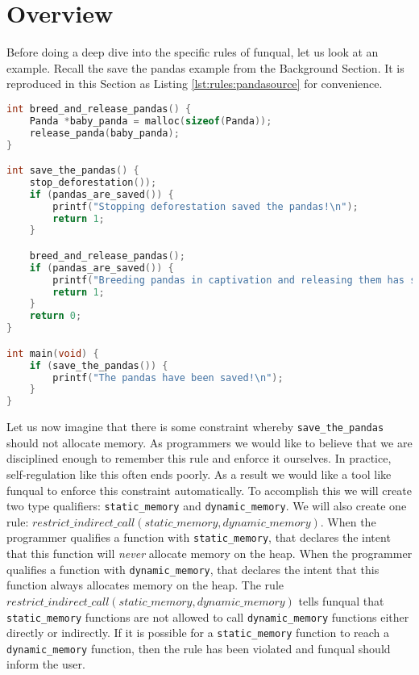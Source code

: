 \section{Overview}\label{sec:rules:overview}

Before doing a deep dive into the specific rules of funqual, let us look at an example.  Recall the save the pandas example from the Background Section.  It is reproduced in this Section as Listing \ref{lst:rules:pandasource} for convenience.  

\noindent\begin{minipage}[t]{\linewidth}
\begin{lstlisting}[language=C,caption={Example C program.  Running this code in a production environment may not actually save the pandas},label={lst:rules:pandasource}]
int breed_and_release_pandas() {
    Panda *baby_panda = malloc(sizeof(Panda));
    release_panda(baby_panda);
}

int save_the_pandas() {
	stop_deforestation());
	if (pandas_are_saved()) {
		printf("Stopping deforestation saved the pandas!\n");
		return 1;
	}

	breed_and_release_pandas();
	if (pandas_are_saved()) {
		printf("Breeding pandas in captivation and releasing them has saved the pandas!\n");
		return 1;
	}
	return 0;
}

int main(void) {
	if (save_the_pandas()) {
		printf("The pandas have been saved!\n");
	}
}
\end{lstlisting}
\end{minipage}

\begin{sloppypar}
Let us now imagine that there is some constraint whereby \lstinline{save_the_pandas} should not allocate memory. As programmers we would like to believe that we are disciplined enough to remember this rule and enforce it ourselves. In practice, self-regulation like this often ends poorly. As a result we would like a tool like funqual to enforce this constraint automatically. To accomplish this we will create two type qualifiers: \lstinline{static_memory} and \mbox{\lstinline{dynamic_memory}.} We will also create one rule: $restrict\_indirect\_call(static\_memory, dynamic\_memory)$. When the programmer qualifies a function with \lstinline{static_memory}, that declares the intent that this function will \textit{never} allocate memory on the heap. When the programmer qualifies a function with \lstinline{dynamic_memory}, that declares the intent that this function always allocates memory on the heap. The rule $restrict\_indirect\_call(static\_memory, dynamic\_memory)$ tells funqual that \lstinline{static_memory} functions are not allowed to call \lstinline{dynamic_memory} functions either directly or indirectly. If it is possible for a \lstinline{static_memory} function to reach a \lstinline{dynamic_memory} function, then the rule has been violated and funqual should inform the user. 
\end{sloppypar}

